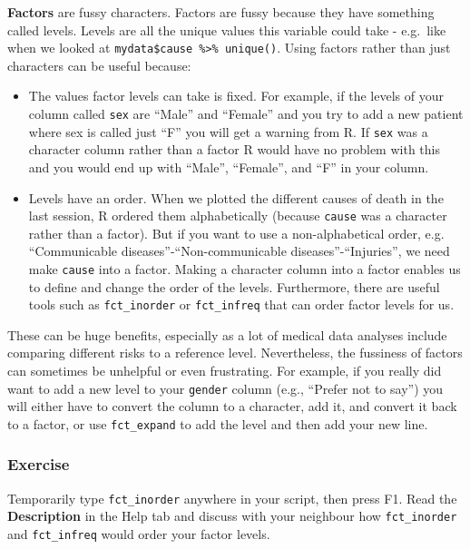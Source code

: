 \documentclass[]{book}
\providecommand{\tightlist}{%
  \setlength{\itemsep}{0pt}\setlength{\parskip}{0pt}}
\begin{document}
\textbf{Factors} are fussy characters. Factors are fussy because they
have something called levels. Levels are all the unique values this
variable could take - e.g.~like when we looked at
\texttt{mydata\$cause\ \%\textgreater{}\%\ unique()}. Using factors
rather than just characters can be useful because:

\begin{itemize}
\tightlist
\item
  The values factor levels can take is fixed. For example, if the levels
  of your column called \texttt{sex} are ``Male'' and ``Female'' and you
  try to add a new patient where sex is called just ``F'' you will get a
  warning from R. If \texttt{sex} was a character column rather than a
  factor R would have no problem with this and you would end up with
  ``Male'', ``Female'', and ``F'' in your column.
\item
  Levels have an order. When we plotted the different causes of death in
  the last session, R ordered them alphabetically (because
  \texttt{cause} was a character rather than a factor). But if you want
  to use a non-alphabetical order, e.g. ``Communicable
  diseases''-``Non-communicable diseases''-``Injuries'', we need make
  \texttt{cause} into a factor. Making a character column into a factor
  enables us to define and change the order of the levels. Furthermore,
  there are useful tools such as \texttt{fct\_inorder} or
  \texttt{fct\_infreq} that can order factor levels for us.
\end{itemize}

These can be huge benefits, especially as a lot of medical data analyses
include comparing different risks to a reference level. Nevertheless,
the fussiness of factors can sometimes be unhelpful or even frustrating.
For example, if you really did want to add a new level to your
\texttt{gender} column (e.g., ``Prefer not to say'') you will either
have to convert the column to a character, add it, and convert it back
to a factor, or use \texttt{fct\_expand} to add the level and then add
your new line.

\subsubsection{Exercise}\label{exercise-8}

Temporarily type \texttt{fct\_inorder} anywhere in your script, then
press F1. Read the \textbf{Description} in the Help tab and discuss with
your neighbour how \texttt{fct\_inorder} and \texttt{fct\_infreq} would
order your factor levels.
\end{document}
